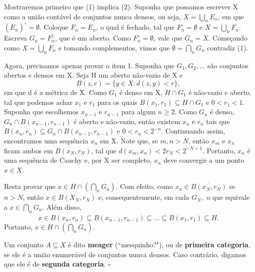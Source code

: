 \documentclass[MeasureTheory/measure_theory.tex]{subfiles}
\begin{document}
\begin{proof*}
	Mostraremos primeiro que (1) implica (2). Suponha que possamos escrever X como a união contável de conjuntos nunca densos, ou seja, \(X = \bigcup_{n}^{}E_{n}\), em que \((\overline{E}_{n})^{\circ } = \emptyset .\) Coloque \(F_{n} = \overline{E}_{n}\), o qual é fechado, tal que
	\(F_{n}^{\circ } = \emptyset \) e \(X = \bigcup_{n}^{}F_{n}.\) Escreva \(G_{n} = F_{n}^{\complement}\), que é um aberto. Como \(F_{n}^{\circ } = \emptyset \), vale que \(\overline{G}_{n} = X.\) Começando como \(X = \bigcup_{n}^{}F_{n}\) e tomando complementos, vimos que \(\emptyset = \bigcap_{n}^{}G_{n}\) contradiz (1).

	Agora, precisamos apenas provar o item 1. Suponha que \(G_1, G_2, \dotsc \) são conjuntos abertos e densos em X. Seja H um aberto não-vazio de X e
	\[
		B(z, r) = \{y\in X: d(z, y) < r\},
	\]
	em que d é a métrica de X. Como \(G_{1}\) é denso em X, \(H\cap G_1\) é não-vazio e aberto, tal que podemos achar \(x_1\) e \(r_1\) para os quais \(\overline{B(x_1, r_1)}\subseteq H\cap G_1\) e \(0 < r_1 < 1.\) Suponha que escolhemos
	\(x_{n-1}\) e \(r_{n-1}\) para algum \(n\geq 2\). Como \(G_{n}\) é denso, \(G_{n}\cap B(x_{n-1}, r_{n-1})\) é aberto e não-vazio, então existem \(x_{n}\) e \(r_{n}\) tais que \(\overline{B(x_{n}, r_{n})}\subseteq G_{n}\cap B(x_{n-1}, r_{n-1})\) e \(0< r_{n} < 2^{-n}.\) Continuando assim, encontramos uma sequência \(x_{n}\) em X.
	Note que, se \(m, n > N\), então \(x_{m}\) e \(x_{n}\) ficam ambos em \(B(x_{N}, r_{N})\), tal que \(d(x_{m}, x_{n}) < 2r_{N} < 2^{-N+1}.\) Portanto, \(x_{n}\) é uma sequência de Cauchy e, por X ser completo, \(x_{n}\) deve convergir a um ponto \(x\in X\).

	Resta provar que \(x\in H \cap (\bigcap_{n}^{}G_{n})\). Com efeito, como \(x_{n}\in \overline{B(x_{N}, r_{N})}\) se \(n > N\), então \(x\in \overline{B(X_{N}, r_{N})} \) e, consequentemente, em cada \(G_{N},\) o que equivale a \(x\in \bigcap_{n}^{}G_{n}\). Além disso,
	\[
		x\in \overline{B(x_{n}, r_{n})}\subseteq B(x_{n-1}, r_{n-1})\subseteq \dotsc \subseteq B(x_1, r_1)\subseteq H.
	\]
	Portanto, \(x\in H\cap (\bigcap_{n}^{}G_{n})\). \qedsymbol
\end{proof*}
\begin{def*}
	Um conjunto \(A\subseteq X\) é dito \textbf{meager} (``mesquinho?"), ou de \textbf{primeira categoria}, se ele é a união enumerável de conjuntos nunca densos. Caso contrário, digamos que ele é de \textbf{segunda categoria}. \(\square\)
\end{def*}
\end{document}
